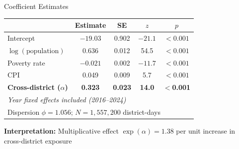 \documentclass[aspectratio=169]{beamer}
\begin{document}
\begin{frame}{Coefficient Estimates}

\begin{center}
\small
\begin{tabular}{lcccc}
\toprule
& \textbf{Estimate} & \textbf{SE} & \textbf{$z$} & \textbf{$p$} \\
\midrule
Intercept & $-19.03$ & 0.902 & $-21.1$ & $<0.001$ \\
$\log(\text{population})$ & 0.636 & 0.012 & 54.5 & $<0.001$ \\
Poverty rate & $-0.021$ & 0.002 & $-11.7$ & $<0.001$ \\
CPI & 0.049 & 0.009 & 5.7 & $<0.001$ \\
\midrule
\textbf{Cross-district ($\alpha$)} & \textbf{0.323} & \textbf{0.023} & \textbf{14.0} & $<$\textbf{0.001} \\
\midrule
\multicolumn{5}{l}{\textit{Year fixed effects included (2016--2024)}} \\
\bottomrule
\multicolumn{5}{l}{Dispersion $\phi = 1.056$; $N = 1{,}557{,}200$ district-days} \\
\end{tabular}
\end{center}

\vspace{0.5em}

\textbf{Interpretation:} Multiplicative effect $\exp(\alpha) = 1.38$ per unit increase in cross-district exposure

\end{frame}
\end{document}
